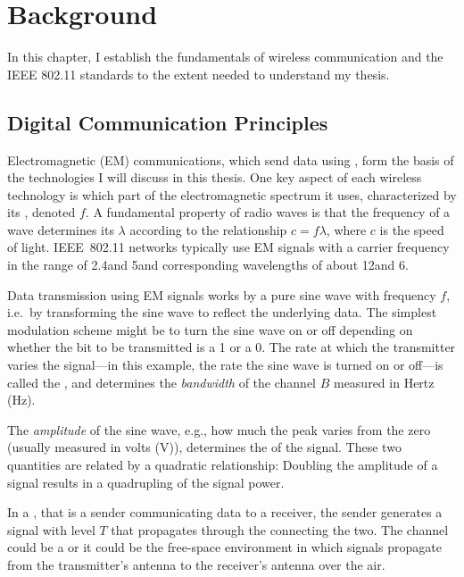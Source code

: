 \ifx\mainfile\undefined

\setcounter{chapter}{1} %
\fi

\cleardoublepage
\chapter{Background}
\label{chap:background}

In this chapter, I establish the fundamentals of wireless communication and the IEEE 802.11 standards to the extent needed to understand my thesis.

\section{Digital Communication Principles}
Electromagnetic (EM) communications, which send data using , form the basis of the technologies I will discuss in this thesis. One key aspect of each wireless technology is which part of the electromagnetic spectrum it uses, characterized by its , denoted $f$. A fundamental property of radio waves is that the frequency of a wave determines its  $\lambda$ according to the relationship $c=f\lambda$, where $c$ is the speed of light. IEEE~802.11 networks typically use EM signals with a carrier frequency in the range of 2.4\GHz and 5\GHz and corresponding wavelengths of about 12\cm and 6\cm.

Data transmission using EM signals works by  a pure sine wave with frequency $f$, i.e.\ by transforming the sine wave to reflect the underlying data. The simplest modulation scheme might be to turn the sine wave on or off depending on whether the bit to be transmitted is a 1 or a 0. The rate at which the transmitter varies the signal---in this example, the rate the sine wave is turned on or off---is called the , and determines the \emph{bandwidth} of the channel $B$ measured in Hertz (Hz).

The \emph{amplitude} of the sine wave, e.g., how much the peak varies from the zero (usually measured in volts (V)), determines the  of the signal. These two quantities are related by a quadratic relationship: Doubling the amplitude of a signal results in a quadrupling of the signal power.

In a , that is a sender communicating data to a receiver, the sender generates a signal with  level $T$ that propagates through the  connecting the two. The channel could be a  or it could be the free-space  environment in which signals propagate from the transmitter's antenna to the receiver's antenna over the air.

